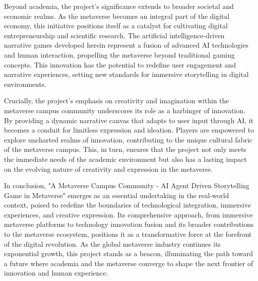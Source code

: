 Beyond academia, the project's significance extends to broader societal and economic realms. 
As the metaverse becomes an integral part of the digital economy, this initiative positions itself as a catalyst for cultivating digital entrepreneurship and scientific research. 
The artificial intelligence-driven narrative games developed herein represent a fusion of advanced AI technologies and human interaction, propelling the metaverse beyond traditional gaming concepts. 
This innovation has the potential to redefine user engagement and narrative experiences, setting new standards for immersive storytelling in digital environments.

Crucially, the project's emphasis on creativity and imagination within the metaverse campus community underscores its role as a harbinger of innovation. 
By providing a dynamic narrative canvas that adapts to user input through AI, it becomes a conduit for limitless expression and ideation. 
Players are empowered to explore uncharted realms of innovation, contributing to the unique cultural fabric of the metaverse campus. 
This, in turn, ensures that the project not only meets the immediate needs of the academic environment but also has a lasting impact on the evolving nature of creativity and expression in the metaverse.

In conclusion, "A Metaverse Campus Community - AI Agent Driven Storytelling Game in Metaverse" emerges as an essential undertaking in the real-world context, 
poised to redefine the boundaries of technological integration, immersive experiences, and creative expression. 
Its comprehensive approach, from immersive metaverse platforms to technology innovation fusion and its broader contributions to the metaverse ecosystem, positions it as a transformative force at the forefront of the digital revolution. 
As the global metaverse industry continues its exponential growth, this project stands as a beacon, illuminating the path toward a future where academia and the metaverse converge to shape the next frontier of innovation and human experience.




